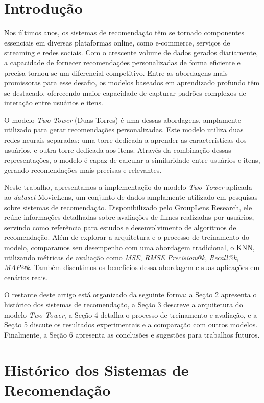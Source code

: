 \documentclass[sigconf]{acmart}
\begin{document}
\section{Introdução}

Nos últimos anos, os sistemas de recomendação têm se tornado componentes essenciais em diversas plataformas online, como e-commerce, serviços de streaming e redes sociais. Com o crescente volume de dados gerados diariamente, a capacidade de fornecer recomendações personalizadas de forma eficiente e precisa tornou-se um diferencial competitivo. Entre as abordagens mais promissoras para esse desafio, os modelos baseados em aprendizado profundo têm se destacado, oferecendo maior capacidade de capturar padrões complexos de interação entre usuários e itens.

O modelo \textit{Two-Tower} (Duas Torres) é uma dessas abordagens, amplamente utilizado para gerar recomendações personalizadas. Este modelo utiliza duas redes neurais separadas: uma torre dedicada a aprender as características dos usuários, e outra torre dedicada aos itens. Através da combinação dessas representações, o modelo é capaz de calcular a similaridade entre usuários e itens, gerando recomendações mais precisas e relevantes.

Neste trabalho, apresentamos a implementação do modelo \textit{Two-Tower} aplicada ao \textit{dataset} MovieLens, um conjunto de dados amplamente utilizado em pesquisas sobre sistemas de recomendação. Disponibilizado pelo GroupLens Research, ele reúne informações detalhadas sobre avaliações de filmes realizadas por usuários, servindo como referência para estudos e desenvolvimento de algoritmos de recomendação. Além de explorar a arquitetura e o processo de treinamento do modelo, comparamos seu desempenho com uma abordagem tradicional, o KNN, utilizando métricas de avaliação como \textit{MSE}, \textit{RMSE} \textit{Precision@k}, \textit{Recall@k}, \textit{MAP@k}. Também discutimos os benefícios dessa abordagem e suas aplicações em cenários reais.

O restante deste artigo está organizado da seguinte forma: a Seção 2 apresenta o histórico dos sistemas de recomendação, a Seção 3 descreve a arquitetura do modelo \textit{Two-Tower}, a Seção 4 detalha o processo de treinamento e avaliação, e a Seção 5 discute os resultados experimentais e a comparação com outros modelos. Finalmente, a Seção 6 apresenta as conclusões e sugestões para trabalhos futuros.

\section{Histórico dos Sistemas de Recomendação}
\end{document}
